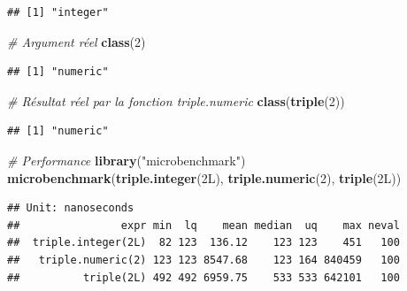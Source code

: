 \documentclass[
  12pt,
  french,
  a4paper,
  extrafontsizes,onecolumn,openright
  ]{memoir}
\newenvironment{Shaded}{\begin{snugshade}}{\end{snugshade}}
\newcommand{\CommentTok}[1]{\textcolor[rgb]{0.56,0.35,0.01}{\textit{#1}}}
\newcommand{\DataTypeTok}[1]{\textcolor[rgb]{0.13,0.29,0.53}{#1}}
\newcommand{\DecValTok}[1]{\textcolor[rgb]{0.00,0.00,0.81}{#1}}
\newcommand{\FunctionTok}[1]{\textcolor[rgb]{0.13,0.29,0.53}{\textbf{#1}}}
\newcommand{\NormalTok}[1]{#1}
\newcommand{\StringTok}[1]{\textcolor[rgb]{0.31,0.60,0.02}{#1}}
\newlength{\rf}
\begin{document}
\begin{verbatim}
## [1] "integer"
\end{verbatim}

\begin{Shaded}
\begin{Highlighting}[]
\CommentTok{\# Argument réel}
\FunctionTok{class}\NormalTok{(}\DecValTok{2}\NormalTok{)}
\end{Highlighting}
\end{Shaded}

\begin{verbatim}
## [1] "numeric"
\end{verbatim}

\begin{Shaded}
\begin{Highlighting}[]
\CommentTok{\# Résultat réel par la fonction triple.numeric}
\FunctionTok{class}\NormalTok{(}\FunctionTok{triple}\NormalTok{(}\DecValTok{2}\NormalTok{))}
\end{Highlighting}
\end{Shaded}

\begin{verbatim}
## [1] "numeric"
\end{verbatim}

\begin{Shaded}
\begin{Highlighting}[]
\CommentTok{\# Performance}
\FunctionTok{library}\NormalTok{(}\StringTok{"microbenchmark"}\NormalTok{)}
\FunctionTok{microbenchmark}\NormalTok{(}\FunctionTok{triple.integer}\NormalTok{(}\DecValTok{2}\DataTypeTok{L}\NormalTok{), }\FunctionTok{triple.numeric}\NormalTok{(}\DecValTok{2}\NormalTok{), }\FunctionTok{triple}\NormalTok{(}\DecValTok{2}\DataTypeTok{L}\NormalTok{))}
\end{Highlighting}
\end{Shaded}

\begin{verbatim}
## Unit: nanoseconds
##                expr min  lq    mean median  uq    max neval
##  triple.integer(2L)  82 123  136.12    123 123    451   100
##   triple.numeric(2) 123 123 8547.68    123 164 840459   100
##          triple(2L) 492 492 6959.75    533 533 642101   100
\end{verbatim}

\normalsize
\end{document}
